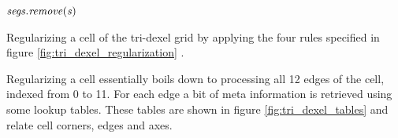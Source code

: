 \begin{algorithm}
\begin{algorithmic}[1]
						\State $\mathit{segs}.\mathit{remove}(\mathit{s})$
					\EndIf
				\EndFor
			\EndFor
		\EndFunction
	\end{algorithmic}
	\caption{
		Regularizing a cell of the tri-dexel grid by applying the four rules specified in figure \ref{fig:tri_dexel_regularization} \cite{tridexel_reconstruction}.
	}
	\label{alg:tri_dexel_regularization}
\end{algorithm}
%
Regularizing a cell essentially boils down to processing all 12 edges of the cell, indexed from 0 to 11.
For each edge a bit of meta information is retrieved using some lookup tables.
These tables are shown in figure \ref{fig:tri_dexel_tables} and relate cell corners, edges and axes.
%
